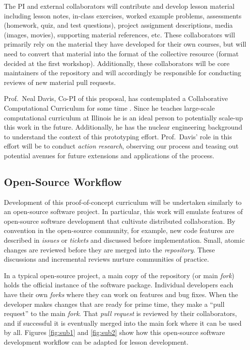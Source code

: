 \documentclass[11pt]{article}
\begin{document}
          The PI and external collaborators will contribute and develop lesson 
          material including lesson notes, in-class exercises, worked example 
          problems, assessments (homework, quiz, and test questions), project 
          assignment descriptions, media (images, movies), supporting material 
          references, etc. These collaborators will primarily rely on the 
          material they have developed for their own courses, but will need to 
          convert that material into the format of the collective resource 
          (format decided at the first workshop). Additionally, these 
          collaborators will be core maintainers of the repository and will 
          accordingly be responsible for conducting reviews of new material 
          pull requests.

          Prof.~Neal Davis, Co-PI of this proposal, has contemplated a 
          Collaborative Computational Curriculum for some time 
          \cite{davis_university_2016}. Since he 
          teaches large-scale computational curriculum at Illinois 
          he is an ideal person to potentially scale-up this work in the 
          future. Additionally, he has the nuclear engineering background to 
          understand the context of this prototyping effort. Prof.~Davis' role 
          in this effort will be to conduct \emph{action research}, observing 
          our process and teasing out potential avenues for future 
          extensions and applications of the process. 

          \subsection{Open-Source Workflow}
          Development of this proof-of-concept curriculum will be undertaken 
          similarly to an open-source software project. 
          In particular, this work will emulate features of open-source software development 
          that cultivate distributed collaboration. By convention in the open-source community, for 
          example, new code features are described in \emph{issues} or 
          \emph{tickets} and discussed before implementation. Small, atomic 
          changes are reviewed before they are merged into the 
          \emph{repository}. These discussions and incremental reviews nurture 
          communities of practice.

          In a typical open-source project, a main copy of the 
          repository (or main \emph{fork}) holds the 
          official instance of the software package. Individual developers each have their own 
          \emph{forks} where they can work on features and 
          bug fixes. When the developer makes changes that are ready for prime 
          time, they make a ``pull request'' to the main \emph{fork}. That 
          \emph{pull request} is 
          reviewed by their collaborators, and if successful it is eventually merged into the 
          main fork where it can be used by all. Figures 
          \ref{fig:sub1} and \ref{fig:sub2} show how this open-source software 
          development workflow can be adapted for lesson development.
\end{document}
